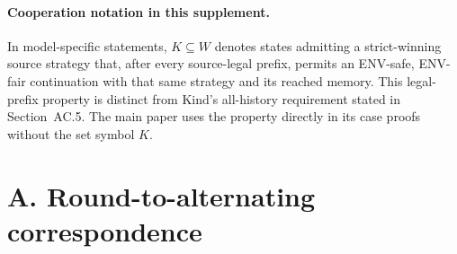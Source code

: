 \documentclass[11pt]{article}
\begin{document}
\paragraph{Cooperation notation in this supplement.}
In model-specific statements, $K\subseteq W$ denotes states admitting a
strict-winning source strategy that, after every source-legal prefix,
permits an ENV-safe, ENV-fair continuation with that same strategy and
its reached memory. This legal-prefix property is distinct from Kind's
all-history requirement stated in Section~AC.5. The main paper uses the
property directly in its case proofs without the set symbol $K$.

\section*{A. Round-to-alternating correspondence}
\end{document}
